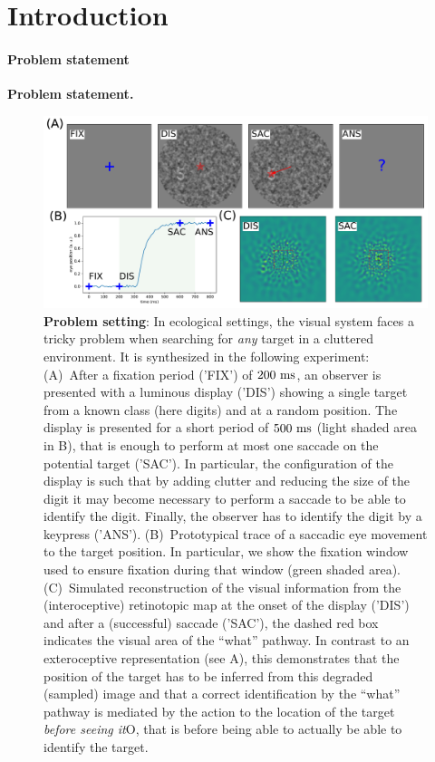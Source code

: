 \CNS
\section{Introduction}
\label{sec:intro}
\paragraph{Problem statement}
\else
\textbf{Problem statement. }
\fi
\begin{figure}[b!]%
	\includegraphics[width=\linewidth]{fig_intro}
	\caption{
		{\bf Problem setting}: \CNS In ecological settings, the visual system faces a tricky problem when searching for \emph{any} target in a cluttered environment. It is synthesized in the following experiment:\fi
		(A)~After a fixation period ('FIX') of $200~\si{\milli\second}$, an observer is presented with a luminous display ('DIS') showing a single target from a known class (here digits) and at a random position. The display is presented for a short period of $500~\si{\milli\second}$ (light shaded area in B), that is enough to perform at most one saccade on the potential target ('SAC'). \CNS In particular, the configuration of the display is such that by adding clutter and reducing the size of the digit it may become necessary to perform a saccade to be able to identify the digit. \fi  Finally, the observer has to identify the digit by a keypress ('ANS'). %
		(B)~Prototypical trace of a saccadic eye movement to the target position. \CNS In particular, we show the fixation window used to ensure fixation during that window (green shaded area). \fi (C)~Simulated reconstruction of the visual information from the (interoceptive) retinotopic map at the onset of the display ('DIS') and after a (successful) saccade ('SAC'), the dashed red box indicates the visual area of the ``what'' pathway. In contrast to an exteroceptive representation (see A), this demonstrates that the position of the target has to be inferred from this degraded (sampled) image and that a correct identification by the ``what'' pathway is mediated by the action to the location of the target \emph{before seeing it}\if O\CNS , that is before being able to actually be able to identify the target\fi.
		\label{fig:intro}}%
\end{figure}%
